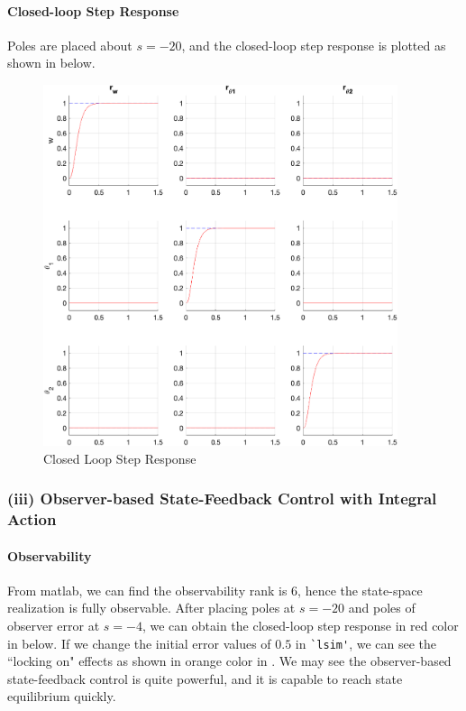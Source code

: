\documentclass{tron}
\begin{document}
\paragraph{Closed-loop Step Response}
Poles are placed about $s=-20$, and the closed-loop step response is plotted as shown in  below.
\begin{figure}[H]
	\centering
	\includegraphics[height=400px]{../matlab/output/p6b/mimo_response_IC=0}
	\caption{Closed Loop Step Response}
	\label{fig:p6b:step-response}
\end{figure}


\subsubsection{(iii) Observer-based State-Feedback Control with Integral Action}
\paragraph{Observability}
From matlab, we can find the observability rank is 6, hence the state-space realization is fully observable.
After placing poles at $s=-20$ and poles of observer error at $s=-4$, we can obtain the closed-loop step response in red color in  below. If we change the initial error values of $0.5$ in \verb|`lsim'|, we can see the ``locking on" effects as shown in orange color in . We may see the observer-based state-feedback control is quite powerful, and it is capable to reach state equilibrium quickly.
\end{document}

